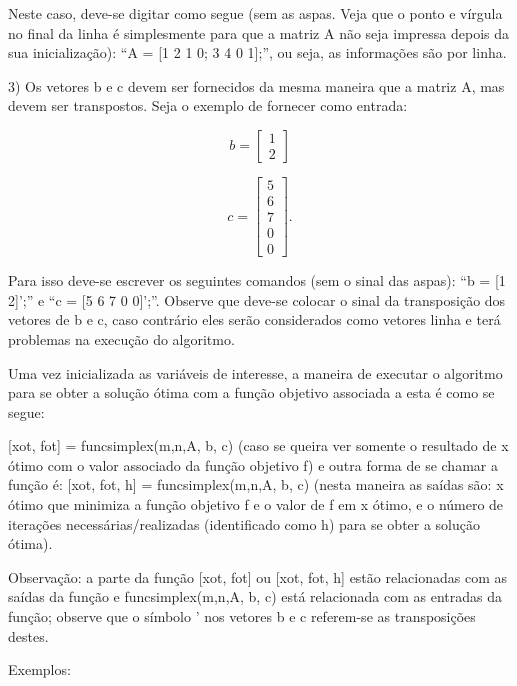 \documentclass[10pt]{article}
\begin{document}
Neste caso, deve-se digitar como segue (sem as aspas. Veja que o ponto e vírgula no final da linha é simplesmente para que a matriz A não seja impressa depois da sua inicialização): ``A = [1 2 1 0; 3 4 0 1];'', ou seja, as informações são por linha.
\newline

3) Os vetores b e c devem ser fornecidos da mesma maneira que a matriz A, mas devem ser transpostos. Seja o exemplo de fornecer como entrada:

\[
b = 
  \begin{bmatrix}
	1\\
	2
  \end{bmatrix}
\]

\[
c = 
  \begin{bmatrix}
	5\\
	6\\
	7\\
	0\\
	0
  \end{bmatrix}.
\]

Para isso deve-se escrever os seguintes comandos (sem o sinal das aspas): ``b = [1 2]';'' e ``c = [5 6 7 0 0]';''. Observe que deve-se colocar o sinal da transposição dos vetores de b e c, caso contrário eles serão considerados como vetores linha e terá problemas na execução do algoritmo.
\newline

Uma vez inicializada as variáveis de interesse, a maneira de executar o algoritmo para se obter a solução ótima com a função objetivo associada a esta é como se segue:
\newline

[xot, fot] = funcsimplex(m,n,A, b, c) (caso se queira ver somente o resultado de x ótimo com o valor associado da função objetivo f) e outra forma de se chamar a função é: [xot, fot, h] = funcsimplex(m,n,A, b, c) (nesta maneira as saídas são: x ótimo que minimiza a função objetivo f e o valor de f em x ótimo, e o número de iterações necessárias/realizadas (identificado como h) para se obter a solução ótima).
\newline

Observação: a parte da função [xot, fot] ou [xot, fot, h] estão relacionadas com as saídas da função e funcsimplex(m,n,A, b, c) está relacionada com as entradas da função; observe que o símbolo ' nos vetores b e c referem-se as transposições destes.

Exemplos:
\newline
\end{document}
